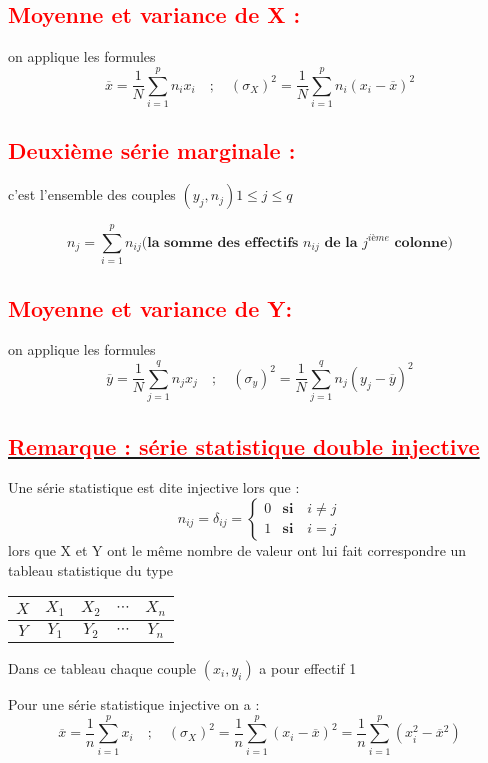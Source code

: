 \documentclass[12pt]{article}
\begin{document}
\subsection*{\textbf{\textcolor{red}{Moyenne et variance de X :}}}
on applique les formules 
\[\overline{x}=\frac{1}{N}\sum_{i=1}^{p}n_{i}x_{i}\quad;\quad (\sigma_{X})^{2}=\frac{1}{N}\sum_{i=1}^{p}n_{i}(x_{i}-\overline{x})^{2}\]
\subsection*{\textbf{\textcolor{red}{Deuxième série marginale :}}}
c’est l’ensemble des couples $(y_{j},n_{j})1\leq j\leq q$

\[n_{j}=\sum_{i=1}^{p}n_{ij} \textbf{(la somme des effectifs $n_{ij}$ de la $j^{ième}$ colonne)} \]   
\subsection*{\textbf{\textcolor{red}{Moyenne et variance de Y:}}}
on applique les formules 
\[\overline{y}=\frac{1}{N}\sum_{j=1}^{q}n_{j}x_{j}\quad;\quad (\sigma_{y})^{2}=\frac{1}{N}\sum_{j=1}^{q}n_{j}(y_{j}-\overline{y})^{2}\]
\subsection*{\underline{\textbf{\textcolor{red}{Remarque : série statistique double injective}}}}
Une série statistique est dite injective lors que : 
\[n_{ij}=\delta_{ij}=
\left\{
\begin{array}{rcl}
0 & \textbf{si}\quad i\neq j \\
1 & \textbf{si}\quad i = j
\end{array}
\right.
\]
lors que X et Y ont le même nombre de valeur ont lui fait correspondre un tableau statistique du type 

\begin{table}[h]
\begin{tabular}{|c|c|c|c|c|}
\hline
$X$  & $X_{1}$ & $X_{2}$ & $\cdots$ & $X_{n}$ \\
\hline
$Y$  & $Y_{1}$ & $Y_{2}$ & $\cdots$ & $Y_{n}$   \\
\hline
\end{tabular}
\end{table}
Dans ce tableau chaque couple $(x_{i}, y_{i})$ a pour effectif 1

Pour une série statistique injective on a : \[\overline{x}=\frac{1}{n}\sum_{i=1}^{p}x_{i}\quad;\quad (\sigma_{X})^{2}=\frac{1}{n}\sum_{i=1}^{p}(x_{i}-\overline{x})^{2}=\frac{1}{n}\sum_{i=1}^{p}(x_{i}^{2}-\overline{x}^{2})\]
\end{document}

